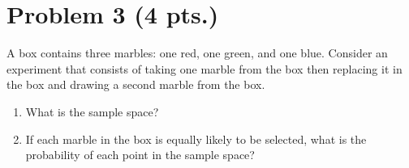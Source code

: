 \documentclass[11pt]{article}
\theoremstyle{definition}
\begin{document}
\section*{Problem 3 (4 pts.)}

A box contains three marbles: one red, one green, and one blue. Consider an experiment that consists of taking one marble from the box then replacing it in the box and drawing a second marble from the box.

\begin{enumerate}
	\item What is the sample space?
	\item If each marble in the box is equally likely to be selected, what is the probability of each point in the sample space?
\end{enumerate}
\end{document}
